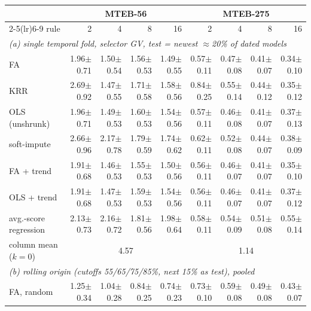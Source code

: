 \begin{tabular}{lrrrrrrrr}
\toprule
 & \multicolumn{4}{c}{MTEB-56} & \multicolumn{4}{c}{MTEB-275} \\
\cmidrule(lr){2-5}\cmidrule(lr){6-9}
rule & 2 & 4 & 8 & 16 & 2 & 4 & 8 & 16 \\
\midrule
\multicolumn{9}{l}{\emph{(a) single temporal fold, selector GV, test = newest $\approx$20\% of dated models}} \\
FA & 1.96{\tiny$\pm$0.71} & 1.50{\tiny$\pm$0.54} & 1.56{\tiny$\pm$0.53} & 1.49{\tiny$\pm$0.55} & 0.57{\tiny$\pm$0.11} & 0.47{\tiny$\pm$0.08} & 0.41{\tiny$\pm$0.07} & 0.34{\tiny$\pm$0.10} \\
KRR & 2.69{\tiny$\pm$0.92} & 1.47{\tiny$\pm$0.55} & 1.71{\tiny$\pm$0.58} & 1.58{\tiny$\pm$0.56} & 0.84{\tiny$\pm$0.25} & 0.55{\tiny$\pm$0.14} & 0.44{\tiny$\pm$0.12} & 0.35{\tiny$\pm$0.12} \\
OLS (unshrunk) & 1.96{\tiny$\pm$0.71} & 1.49{\tiny$\pm$0.53} & 1.60{\tiny$\pm$0.53} & 1.54{\tiny$\pm$0.56} & 0.57{\tiny$\pm$0.11} & 0.46{\tiny$\pm$0.08} & 0.41{\tiny$\pm$0.07} & 0.37{\tiny$\pm$0.13} \\
soft-impute & 2.66{\tiny$\pm$0.96} & 2.17{\tiny$\pm$0.78} & 1.79{\tiny$\pm$0.59} & 1.74{\tiny$\pm$0.62} & 0.62{\tiny$\pm$0.11} & 0.52{\tiny$\pm$0.08} & 0.44{\tiny$\pm$0.07} & 0.38{\tiny$\pm$0.09} \\
FA + trend & 1.91{\tiny$\pm$0.68} & 1.46{\tiny$\pm$0.53} & 1.55{\tiny$\pm$0.53} & 1.50{\tiny$\pm$0.56} & 0.56{\tiny$\pm$0.11} & 0.46{\tiny$\pm$0.07} & 0.41{\tiny$\pm$0.07} & 0.35{\tiny$\pm$0.10} \\
OLS + trend & 1.91{\tiny$\pm$0.68} & 1.47{\tiny$\pm$0.53} & 1.59{\tiny$\pm$0.53} & 1.54{\tiny$\pm$0.56} & 0.56{\tiny$\pm$0.11} & 0.46{\tiny$\pm$0.07} & 0.41{\tiny$\pm$0.07} & 0.37{\tiny$\pm$0.12} \\
avg.-score regression & 2.13{\tiny$\pm$0.73} & 2.16{\tiny$\pm$0.72} & 1.81{\tiny$\pm$0.56} & 1.98{\tiny$\pm$0.64} & 0.58{\tiny$\pm$0.11} & 0.54{\tiny$\pm$0.09} & 0.51{\tiny$\pm$0.08} & 0.55{\tiny$\pm$0.14} \\
column mean ($k=0$) & \multicolumn{4}{c}{4.57} & \multicolumn{4}{c}{1.14} \\
\midrule
\multicolumn{9}{l}{\emph{(b) rolling origin (cutoffs 55/65/75/85\%, next 15\% as test), pooled}} \\
FA, random & 1.25{\tiny$\pm$0.34} & 1.04{\tiny$\pm$0.28} & 0.84{\tiny$\pm$0.25} & 0.74{\tiny$\pm$0.23} & 0.73{\tiny$\pm$0.10} & 0.59{\tiny$\pm$0.08} & 0.49{\tiny$\pm$0.08} & 0.43{\tiny$\pm$0.07} \\

\end{tabular}
